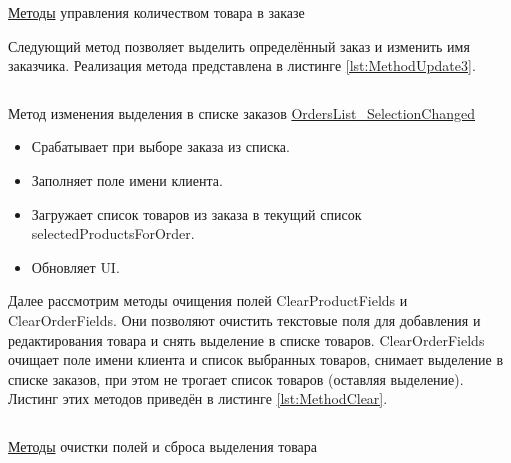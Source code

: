 \documentclass[12pt]{article}
\newcommand{\colorGIT}[1]{\textcolor{CtpLavender}{#1}}
\renewcommand{\texttt}[1]{{\small\ttfamily #1}}
\begin{document}
\begin{listing}[H]
	\inputminted[firstline=342, lastline=377]{csharp}{../../3lab/StoreManager/MainWindow.xaml.cs}
	\caption{\colorGIT{\href{https://github.com/WebMasterIT/Csharp_Labs/blob/ec375afd16c0647b337cf3d8a79c8bef904fc1be/3lab/StoreManager/MainWindow.xaml.cs\#L342-L377}{Методы}} управления количеством товара в заказе}
	\label{lst:MethodControl}
\end{listing}

Следующий метод позволяет выделить определённый заказ и изменить имя заказчика.
Реализация метода представлена в листинге \ref{lst:MethodUpdate3}.

\begin{listing}[H]
	\inputminted[firstline=379, lastline=390]{csharp}{../../3lab/StoreManager/MainWindow.xaml.cs}
	\caption{Метод изменения выделения в списке заказов \colorGIT{\href{https://github.com/WebMasterIT/Csharp_Labs/blob/ec375afd16c0647b337cf3d8a79c8bef904fc1be/3lab/StoreManager/MainWindow.xaml.cs\#L379-L391}{OrdersList\_SelectionChanged}}}
	\label{lst:MethodUpdate3}
\end{listing}

\begin{itemize}
	\item Срабатывает при выборе заказа из списка.
	\item Заполняет поле имени клиента.
	\item Загружает список товаров из заказа в текущий список \texttt{selectedProductsForOrder}.
	\item Обновляет \texttt{UI}.
\end{itemize}

{}

Далее рассмотрим методы очищения полей \texttt{ClearProductFields} и \texttt{ClearOrderFields}. Они позволяют очистить текстовые поля для добавления и редактирования товара и снять выделение в списке товаров. \texttt{ClearOrderFields} очищает поле имени клиента и список выбранных товаров, снимает выделение в списке заказов, при этом не трогает список товаров (оставляя выделение). Листинг этих методов приведён в листинге \ref{lst:MethodClear}.

\begin{listing}[H]
	\inputminted[firstline=379, lastline=432]{csharp}{../../3lab/StoreManager/MainWindow.xaml.cs}
	\caption{\colorGIT{\href{https://github.com/WebMasterIT/Csharp_Labs/blob/ec375afd16c0647b337cf3d8a79c8bef904fc1be/3lab/StoreManager/MainWindow.xaml.cs\#L379-L432}{Методы}} очистки полей и сброса выделения товара}
	\label{lst:MethodClear}
\end{listing}
\end{document}
